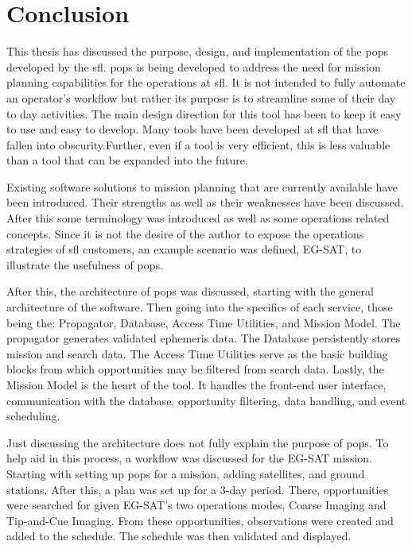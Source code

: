 \glsresetall{} 

\chapter{Conclusion}\label{chap:conclusion}


This thesis has discussed the purpose, design, and implementation of the
\gls{pops} developed by the \gls{sfl}. \gls{pops} is being developed to address
the need for mission planning capabilities for the operations at \gls{sfl}. It
is not intended to fully automate an operator's workflow but rather its purpose
is to streamline some of their day to day activities. The main design direction
for this tool has been to keep it easy to use and easy to develop. Many tools
have been developed at \gls{sfl} that have fallen into obscurity.Further, even
if a tool is very efficient, this is less valuable than a tool that can be
expanded into the future. 

Existing software solutions to mission planning that are currently available
have been introduced. Their strengths as well as their weaknesses have been
discussed. After this some terminology was introduced as well as some
operations related concepts. Since it is not the desire of the author to expose
the operations strategies of \gls{sfl} customers, an example scenario was
defined, EG-SAT, to illustrate the usefulness of \gls{pops}.

After this, the architecture of \gls{pops} was discussed, starting with the
general architecture of the software. Then going into the specifics of each
service, those being the: Propagator, Database, Access Time Utilities, and
Mission Model. The propagator generates validated ephemeris data. The Database
persistently stores mission and search data. The Access Time Utilities serve as
the basic building blocks from which opportunities may be filtered from search
data. Lastly, the Mission Model is the heart of the tool.  It handles the
front-end user interface, communication with the database, opportunity
filtering, data handling, and event scheduling.

Just discussing the architecture does not fully explain the purpose of
\gls{pops}. To help aid in this process, a workflow was discussed for the
EG-SAT mission. Starting with setting up \gls{pops} for a mission, adding
satellites, and ground stations. After this, a plan was set up for a 3-day
period. There, opportunities were searched for given EG-SAT's two operations
modes, Coarse Imaging and Tip-and-Cue Imaging. From these opportunities,
observations were created and added to the schedule. The schedule was then
validated and displayed.  

